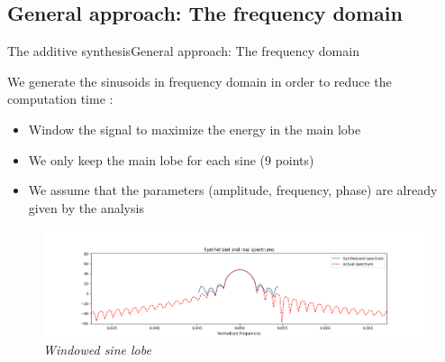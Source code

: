 \documentclass[10pt]{beamer}
\begin{document}
\subsection{General approach: The frequency domain}
\begin{frame}{The additive synthesis}{General approach: The frequency domain}
\begin{block}{}
We generate the sinusoids in frequency domain in order to reduce the computation time : \\

\begin{itemize}
\item Window the signal to maximize the energy in the main lobe
\item We only keep the main lobe for each sine (9 points)
\item We assume that the parameters (amplitude, frequency, phase) are already given by the analysis
\end{itemize}
\end{block}
\begin{figure}
	\centerline
	{\includegraphics[scale=0.75]{lobe.png}}
	\caption{\it Windowed sine lobe}
\end{figure}
\end{frame}
\end{document}
